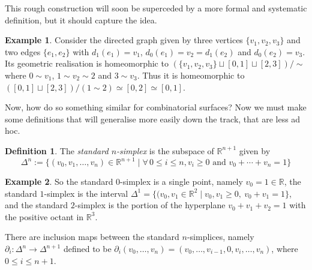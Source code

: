 \documentclass{tufte-handout}
\def\RR{\mathbb{R}}
\theoremstyle{definition}
\newtheorem{definition}{Definition}
\newtheorem{example}{Example}
\begin{document}
This rough construction will soon be superceded by a more formal and systematic definition, 
but it should capture the idea.

\begin{example}\label{eg:join_interval_geom_real}
Consider the directed graph given by three vertices $\{v_1,v_2,v_3\}$ and two edges 
$\{e_1,e_2\}$ with $d_1(e_1) = v_1$, $d_0(e_1) = v_2 = d_1(e_2)$ and $d_0(e_2) = v_3$. Its 
geometric realisation is homeomorphic to $(\{v_1,v_2,v_3\} \sqcup [0,1] \sqcup [2,3])/\!\sim$
where $0\sim v_1$, $1\sim v_2 \sim 2$ and $3\sim v_3$. Thus it is homeomorphic to 
$([0,1]\sqcup [2,3])/(1\sim 2) \simeq [0,2] \simeq [0,1]$.
\end{example}

Now, how do so something similar for combinatorial surfaces? Now we must make some definitions
that will generalise more easily down the track, that are less ad hoc.

\begin{definition}
The \emph{standard $n$-simplex} is the subspace of $\RR^{n+1}$ given by
\[
	\Delta^n := \{(v_0,v_1,\ldots,v_n) \in \RR^{n+1} \mid \forall\, 0\leq i\leq n, v_i\geq 0
			\text{ and } v_0+\cdots+v_n = 1\}
\]
\end{definition}

\begin{example}
So  the standard $0$-simplex is a single point, namely $v_0=1\in \RR$, the standard $1$-simplex
is the interval $\Delta^1 = \{(v_0,v_1\in \RR^2\mid v_0,v_1 \geq0,\ v_0+v_1 = 1\}$, and the 
standard $2$-simplex is the portion of the hyperplane $v_0+v_1+v_2 = 1$ with the positive
octant in $\RR^3$. 
\end{example}

There are inclusion maps between the standard $n$-simplices, namely $\partial_i\colon \Delta^n \to \Delta^{n+1}$
defined to be $\partial_i(v_0,\ldots,v_n) = (v_0,\ldots,v_{i-1},0,v_i,\ldots,v_n)$, where
$0\leq i \leq n+1$.
\end{document}
